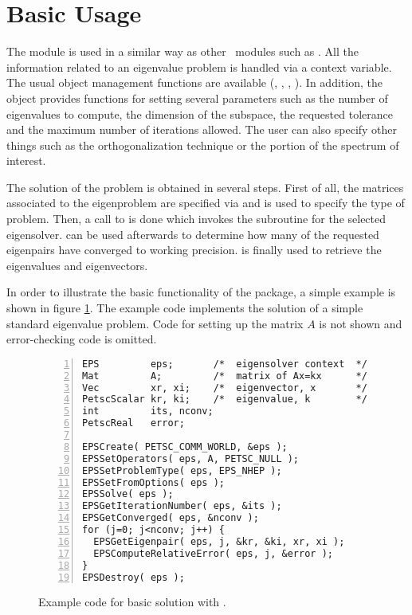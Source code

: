 \section{Basic Usage}

	The  module is used in a similar way as other \petsc\ modules such as . All the information related to an eigenvalue problem is handled via a context variable. The usual object management functions are available (, , , ). In addition, the  object provides functions for setting several parameters such as the number of eigenvalues to compute, the dimension of the subspace, the requested tolerance and the maximum number of iterations allowed. The user can also specify other things such as the orthogonalization technique or the portion of the spectrum of interest.

	The solution of the problem is obtained in several steps. First of all, the matrices associated to the eigenproblem are specified via  and  is used to specify the type of problem. Then, a call to  is done which invokes the subroutine for the selected eigensolver.  can be used afterwards to determine how many of the requested eigenpairs have converged to working precision.  is finally used to retrieve the eigenvalues and eigenvectors. 

	In order to illustrate the basic functionality of the  package, a simple example is shown in figure \ref{fig:ex-eps}. The example code implements the solution of a simple standard eigenvalue problem. Code for setting up the matrix $A$ is not shown and error-checking code is omitted.

\begin{figure}[t]
\begin{Verbatim}[fontsize=\small,numbers=left,numbersep=6pt,xleftmargin=15mm]
EPS         eps;       /*  eigensolver context  */
Mat         A;         /*  matrix of Ax=kx      */
Vec         xr, xi;    /*  eigenvector, x       */
PetscScalar kr, ki;    /*  eigenvalue, k        */
int         its, nconv;
PetscReal   error;

EPSCreate( PETSC_COMM_WORLD, &eps );
EPSSetOperators( eps, A, PETSC_NULL );
EPSSetProblemType( eps, EPS_NHEP );
EPSSetFromOptions( eps );
EPSSolve( eps );
EPSGetIterationNumber( eps, &its );
EPSGetConverged( eps, &nconv );
for (j=0; j<nconv; j++) {
  EPSGetEigenpair( eps, j, &kr, &ki, xr, xi );
  EPSComputeRelativeError( eps, j, &error );
}
EPSDestroy( eps );
\end{Verbatim}
\caption{\label{fig:ex-eps}Example code for basic solution with .}
\end{figure}

